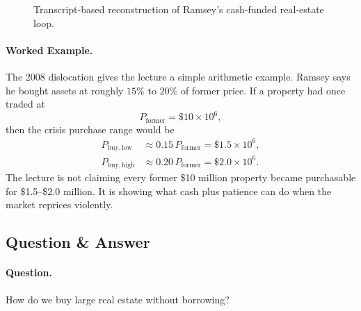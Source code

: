 \begin{figure}[h]
\centering
{}
\caption{Transcript-based reconstruction of Ramsey's cash-funded real-estate loop.}
\end{figure}

\paragraph{Worked Example.} The 2008 dislocation gives the lecture a simple arithmetic example. Ramsey says he bought assets at roughly \(15\%\) to \(20\%\) of former price. If a property had once traded at
\[
P_{\mathrm{former}}=\$10 \times 10^6,
\]
then the crisis purchase range would be
\begin{align}
P_{\mathrm{buy,low}} &\approx 0.15\,P_{\mathrm{former}}=\$1.5 \times 10^6,\\
P_{\mathrm{buy,high}} &\approx 0.20\,P_{\mathrm{former}}=\$2.0 \times 10^6.
\end{align}
The lecture is not claiming every former \$10 million property became purchasable for \$1.5--\$2.0 million. It is showing what cash plus patience can do when the market reprices violently.

\subsection{Question \& Answer}

\paragraph{Question.} How do we buy large real estate without borrowing?

